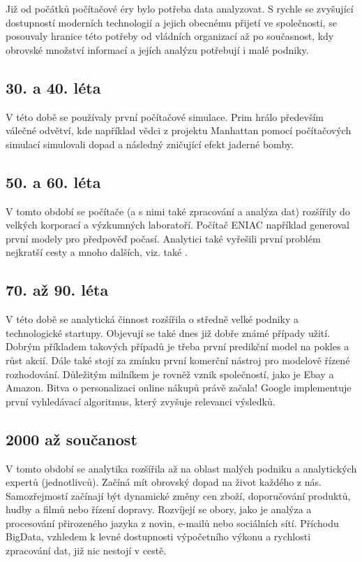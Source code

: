 Již od počátků počítačové éry bylo potřeba data analyzovat. \cite{history} S rychle se zvyšující dostupností moderních technologií a jejich obecnému přijetí ve společnosti, se posouvaly hranice této potřeby od vládních organizací až po současnost, kdy obrovské množství informací a jejích analýzu potřebují i malé podniky.

\subsection{30. a 40. léta}
V této době se používaly první počítačové simulace. Prim hrálo především válečné odvětví, kde například vědci z projektu Manhattan pomocí počítačových simulací simulovali dopad a následný zničující efekt jaderné bomby.

\subsection{50. a 60. léta}
V tomto období se počítače (a s nimi také zpracování a analýza dat) rozšířily do velkých korporací a výzkumných laboratoří. Počítač ENIAC například generoval první modely pro předpověď počasí. Analytici také vyřešili první problém nejkratší cesty a mnoho dalších, viz. také \cite{history}.

\subsection{70. až 90. léta}
V této době se analytická činnost rozšířila o středně velké podniky a technologické startupy. Objevují se také dnes již dobře známé případy užití. Dobrým příkladem takových případů je třeba první predikční model na pokles a růst akcií. Dále také stojí za zmínku první komerční nástroj pro modelově řízené rozhodování. Důležitým milníkem je rovněž vznik společností, jako je Ebay a Amazon. Bitva o personalizaci online nákupů právě začala! Google implementuje první vyhledávací algoritmus, který zvyšuje relevanci výsledků.

\subsection{2000 až součanost}
V tomto období se analytika rozšířila až na oblast malých podniku a analytických expertů (jednotlivců). Začíná mít obrovský dopad na život každého z nás. Samozřejmostí začínají být dynamické změny cen zboží, doporučování produktů, hudby a filmů nebo řízení dopravy. Rozvíjejí se obory, jako je analýza a procesování přirozeného jazyka z novin, e-mailů nebo sociálních sítí. Příchodu BigData, vzhledem k levné dostupnosti výpočetního výkonu a rychlosti zpracování dat, již nic nestojí v cestě.

